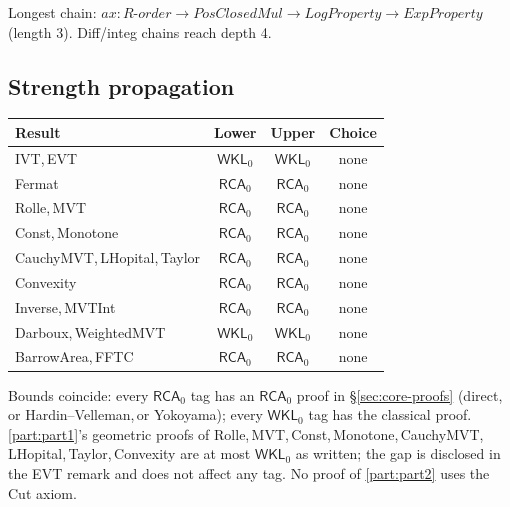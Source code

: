\documentclass[11pt,reqno]{amsart}
\newcommand{\comma}{,\,\allowbreak}
\theoremstyle{redplain}
\begin{document}
\noindent Longest chain: $ax{:}R\text{-}order\to PosClosedMul\to LogProperty\to ExpProperty$ (length 3). Diff/integ chains reach depth 4.

\subsection{Strength propagation}
\bigskip
\begin{center}\small
	\begin{tabular}{|l|c|c|c|}
		\hline
		\textbf{Result} & \textbf{Lower} & \textbf{Upper} & \textbf{Choice} \\ \hline
		\textsf{IVT}\comma \textsf{EVT} & $\textsf{WKL}_0$ & $\textsf{WKL}_0$ & none \\ \hline
		\textsf{Fermat} & $\textsf{RCA}_0$ & $\textsf{RCA}_0$ & none \\ \hline
		\textsf{Rolle}\comma \textsf{MVT} & $\textsf{RCA}_0$ & $\textsf{RCA}_0$ & none \\ \hline
		\textsf{Const}\comma \textsf{Monotone} & $\textsf{RCA}_0$ & $\textsf{RCA}_0$ & none \\ \hline
		\textsf{CauchyMVT}\comma \textsf{LHopital}\comma \textsf{Taylor} & $\textsf{RCA}_0$ & $\textsf{RCA}_0$ & none \\ \hline
		\textsf{Convexity} & $\textsf{RCA}_0$ & $\textsf{RCA}_0$ & none \\ \hline
		\textsf{Inverse}\comma \textsf{MVTInt} & $\textsf{RCA}_0$ & $\textsf{RCA}_0$ & none \\ \hline
		\textsf{Darboux}\comma \textsf{WeightedMVT} & $\textsf{WKL}_0$ & $\textsf{WKL}_0$ & none \\ \hline
		\textsf{BarrowArea}\comma \textsf{FFTC} & $\textsf{RCA}_0$ & $\textsf{RCA}_0$ & none \\ \hline
	\end{tabular}
\end{center}

\medskip

\noindent {} Bounds coincide: every $\textsf{RCA}_0$ tag has an $\textsf{RCA}_0$ proof in \S\ref{sec:core-proofs} (direct\comma or Hardin--Velleman\comma or Yokoyama); every $\textsf{WKL}_0$ tag has the classical proof. \autoref{part:part1}'s geometric proofs of Rolle\comma MVT\comma Const\comma Monotone\comma CauchyMVT\comma LHopital\comma Taylor\comma Convexity are at most $\textsf{WKL}_0$ as written; the gap is disclosed in the EVT remark and does not affect any tag. No proof of \autoref{part:part2} uses the Cut axiom.
\end{document}
